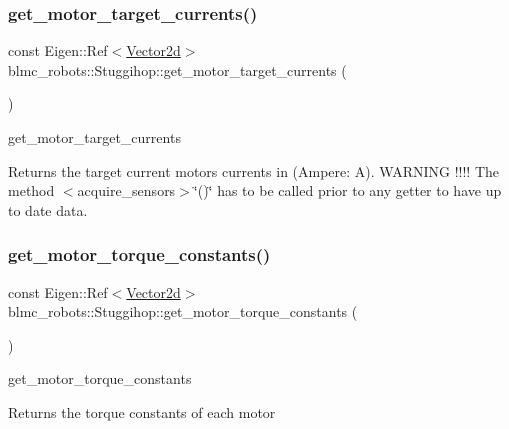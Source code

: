 \subsubsection{\texorpdfstring{get\+\_\+motor\+\_\+target\+\_\+currents()}{get\_motor\_target\_currents()}}
{\footnotesize\ttfamily const Eigen\+::\+Ref$<$\hyperlink{common__header_8hpp_acb6916bc8c9fe9d98c484fd4cc201447}{Vector2d}$>$ blmc\+\_\+robots\+::\+Stuggihop\+::get\+\_\+motor\+\_\+target\+\_\+currents (\begin{DoxyParamCaption}{ }\end{DoxyParamCaption})\hspace{0.3cm}{\ttfamily [inline]}}



get\+\_\+motor\+\_\+target\+\_\+currents 

\begin{DoxyReturn}{Returns}
the target current motors currents in (Ampere\+: A). W\+A\+R\+N\+I\+NG !!!! The method $<$acquire\+\_\+sensors$>$\char`\"{}()\char`\"{} has to be called prior to any getter to have up to date data. 
\end{DoxyReturn}
\mbox{\label{classblmc__robots_1_1Stuggihop_a4c0847fc848bab2d1ad7f76542fffb3c}} 
\subsubsection{\texorpdfstring{get\+\_\+motor\+\_\+torque\+\_\+constants()}{get\_motor\_torque\_constants()}}
{\footnotesize\ttfamily const Eigen\+::\+Ref$<$\hyperlink{common__header_8hpp_acb6916bc8c9fe9d98c484fd4cc201447}{Vector2d}$>$ blmc\+\_\+robots\+::\+Stuggihop\+::get\+\_\+motor\+\_\+torque\+\_\+constants (\begin{DoxyParamCaption}{ }\end{DoxyParamCaption})\hspace{0.3cm}{\ttfamily [inline]}}



get\+\_\+motor\+\_\+torque\+\_\+constants 

\begin{DoxyReturn}{Returns}
the torque constants of each motor 
\end{DoxyReturn}
\mbox{\label{classblmc__robots_1_1Stuggihop_aa3c24185a4ce67f235c535e4913832d2}} 
